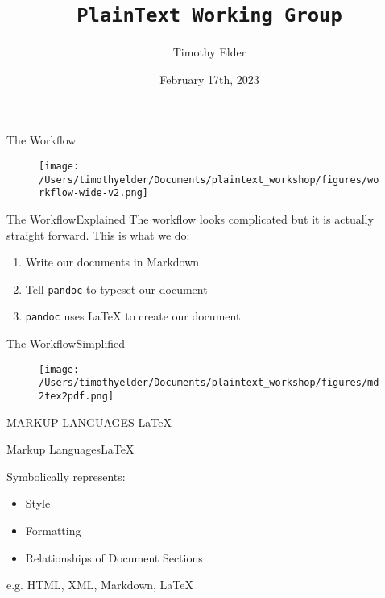\documentclass{beamer}
\title{\texttt{PlainText Working Group}}
\author{Timothy Elder}
\date{February 17th, 2023}
\begin{document}
\begin{frame}
\titlepage
\end{frame}
\begin{frame}{The Workflow}
    \begin{figure}
    \texttt{[image: /Users/timothyelder/Documents/plaintext\_workshop/figures/workflow-wide-v2.png]}
    \end{figure}
\end{frame}

\begin{frame}{The Workflow}{Explained}
    The workflow looks complicated but it is actually straight forward. This is what we do: \newline
    \begin{enumerate}
        \pause
        \item Write our documents in Markdown
        \pause
        \item Tell \texttt{pandoc} to typeset our document
        \pause
        \item \texttt{pandoc} uses LaTeX to create our document
    \end{enumerate}
\end{frame}

\begin{frame}{The Workflow}{Simplified}
    \begin{figure}
    \texttt{[image: /Users/timothyelder/Documents/plaintext\_workshop/figures/md2tex2pdf.png]}
    \end{figure}
\end{frame}

\begin{frame}
    \Huge{MARKUP LANGUAGES} \newline
    \large{\LaTeX}
\end{frame}

\begin{frame}{Markup Languages}{\LaTeX}

    Symbolically represents:
    \begin{itemize}
        \item Style
        \item Formatting
        \item Relationships of Document Sections\newline
    \end{itemize}

    \footnotesize{e.g. HTML, XML, Markdown, \LaTeX}

\end{frame}
\end{document}

